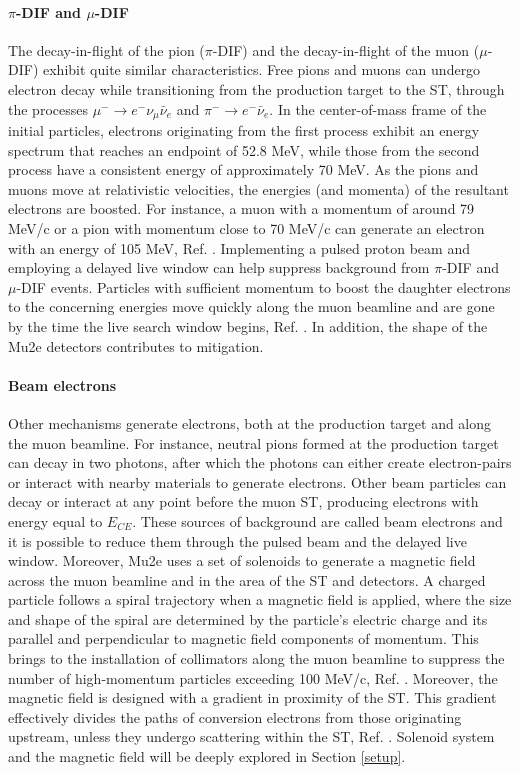 \paragraph{$\pi$-DIF and $\mu$-DIF}
The decay-in-flight of the pion ($\pi$-DIF) and the decay-in-flight of the muon ($\mu$-DIF) exhibit quite similar characteristics. Free pions and muons can 
undergo electron decay while transitioning from the production target to the ST, through the processes $\mu^- \rightarrow e^- \nu_\mu \bar{\nu}_e$ and $\pi^- \rightarrow e^- \bar{\nu}_e$. In the center-of-mass frame of the initial particles, electrons originating from the first process exhibit an energy spectrum that reaches an endpoint of 52.8 MeV, while those from the second process have a consistent energy of approximately 70 MeV. As the pions and muons move at relativistic velocities, the energies (and momenta) of the resultant electrons are boosted. For instance, a muon with a momentum of around 79 MeV/c or a pion with momentum close to 70 MeV/c can generate an electron with an energy of 105 MeV, Ref. \cite{bartoszek2015mu2e}. Implementing a pulsed proton beam and employing a delayed live window can help suppress background from $\pi$-DIF and $\mu$-DIF events. Particles with sufficient momentum to boost the daughter electrons to the concerning energies move quickly along the muon beamline and are gone by the time the live search window begins, Ref. \cite{bobbb}. In addition, the shape of the Mu2e detectors contributes to mitigation.
\paragraph{Beam electrons}\label{beamelectrons}
Other mechanisms generate electrons, both at the production target and along the muon beamline. For instance, neutral pions formed at the production target can decay in two photons, after which the photons can either create electron-pairs or interact with nearby materials to generate electrons. Other beam particles can decay or interact at any point before the muon ST, producing electrons with energy equal to $E_{CE}$. These sources of background are called beam electrons and it is possible to reduce them through the pulsed beam and the delayed live window. Moreover, Mu2e uses a set of solenoids to generate a magnetic field across the muon beamline and in the area of the ST and detectors. A charged particle follows a spiral trajectory when a magnetic field is applied, where the size and shape of the spiral are determined by the particle's electric charge and its parallel and perpendicular to magnetic field components of momentum. This brings to the installation of collimators along the muon beamline to suppress the number of high-momentum particles exceeding 100 MeV/c, Ref. \cite{bartoszek2015mu2e}. Moreover, the magnetic field is 
designed with a gradient in proximity of the ST. This gradient effectively divides the paths of conversion electrons from those originating upstream, unless they undergo scattering within the ST, Ref. \cite{bobbb}. Solenoid system and the magnetic field will be deeply explored in Section \ref{setup}.
